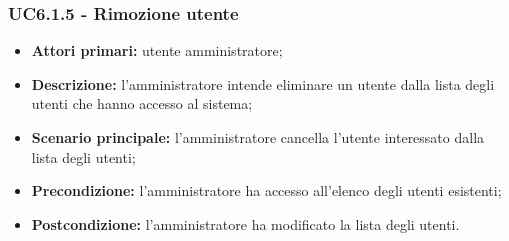 \subsubsection{UC6.1.5 - Rimozione utente}
	\begin{itemize}
		\item \textbf{Attori primari:} utente amministratore;
		\item \textbf{Descrizione:} l'amministratore intende eliminare un utente dalla lista degli utenti che hanno accesso al sistema;
		\item \textbf{Scenario principale:} l'amministratore cancella l'utente interessato dalla lista degli utenti;
		\item \textbf{Precondizione:} l'amministratore ha accesso all'elenco degli utenti esistenti;
		\item \textbf{Postcondizione:} l'amministratore ha modificato la lista degli utenti.
	\end{itemize}

